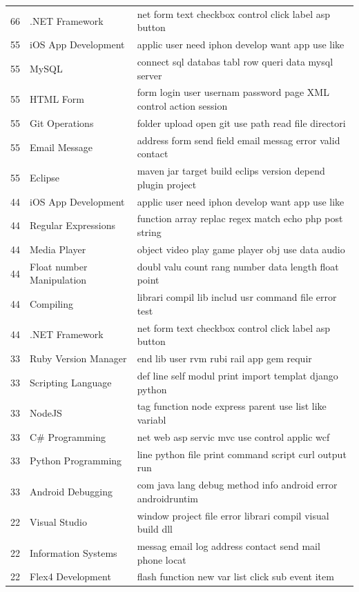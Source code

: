 \documentclass[twocolumn,5p,sort&compress]{elsarticle}
\theoremstyle{break}
\begin{document}
\begin{table}[!t]
\begin{center}
\begin{tabular}{r|l|l}
66 &.NET Framework & net form text checkbox control click label asp button\\
55 &iOS App Development & applic user need iphon develop want app use like\\
55 &MySQL & connect sql databas tabl row queri data mysql server\\
55 &HTML Form & form login user usernam password page XML control action session\\
55 &Git Operations & folder upload open git use path read file directori\\
55 &Email Message & address form send field email messag error valid contact\\
55 &Eclipse & maven jar target build eclips version depend plugin project\\
44 &iOS App Development & applic user need iphon develop want app use like\\
44 &Regular Expressions & function array replac regex match echo php post string\\
44 &Media Player & object video play game player obj use data audio \\ 
44 &Float number Manipulation & doubl valu count rang number data length float point\\
44 &Compiling & librari compil lib includ usr command file error test\\
44 &.NET Framework & net form text checkbox control click label asp button\\
33 &Ruby Version Manager & end lib user rvm rubi rail app gem requir\\
33 &Scripting Language & def line self modul print import templat django python\\
33 &NodeJS & tag function node express parent use list like variabl\\
33 & C\# Programming & net web asp servic mvc use control applic wcf \\ 
33 & Python Programming & line python file print command script curl output run \\ 
33 &Android Debugging & com java lang debug method info android error androidruntim\\
22 & Visual Studio & window project file error librari compil visual build dll \\ 
22 & Information Systems & messag email log address contact send mail phone locat \\ 
22 &Flex4 Development & flash function new var list click sub event item
\end{tabular}
\end{center}
\end{table}
\end{document}
